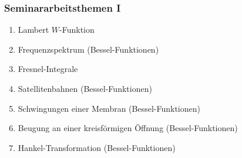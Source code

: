 %
%
%
\begin{frame}
\frametitle{Seminararbeitsthemen I\phantom{II}}
\begin{enumerate}[<+->]
\item Lambert $W$-Funktion
\item Frequenzspektrum (Bessel-Funktionen)
\item Fresnel-Integrale
\item Satellitenbahnen (Bessel-Funktionen)
\item Schwingungen einer Membran (Bessel-Funktionen)
\item Beugung an einer kreisförmigen Öffnung (Bessel-Funktionen)
\item Hankel-Transformation (Bessel-Funktionen)
\end{enumerate}
\end{frame}

